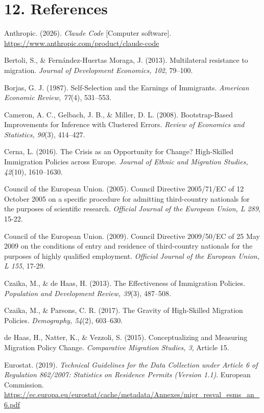 \documentclass[11pt,a4paper]{article}
\newenvironment{hangrefs}{%
  \par\begingroup\setlength{\leftskip}{1.5em}\setlength{\parindent}{-1.5em}%
}{\par\endgroup}
\begin{document}
\section{12. References}\label{references}
\begin{hangrefs}


Anthropic. (2026). \emph{Claude Code} {[}Computer software{]}.
\url{https://www.anthropic.com/product/claude-code}

Bertoli, S., \& Fernández-Huertas Moraga, J. (2013). Multilateral
resistance to migration. \emph{Journal of Development Economics, 102},
79--100.

Borjas, G. J. (1987). Self-Selection and the Earnings of Immigrants.
\emph{American Economic Review, 77}(4), 531--553.

Cameron, A. C., Gelbach, J. B., \& Miller, D. L. (2008). Bootstrap-Based
Improvements for Inference with Clustered Errors. \emph{Review of
Economics and Statistics, 90}(3), 414--427.

Cerna, L. (2016). The Crisis as an Opportunity for Change? High-Skilled
Immigration Policies across Europe. \emph{Journal of Ethnic and
Migration Studies, 42}(10), 1610--1630.

Council of the European Union. (2005). Council Directive 2005/71/EC of
12 October 2005 on a specific procedure for admitting third-country
nationals for the purposes of scientific research. \emph{Official
Journal of the European Union, L 289}, 15-22.

Council of the European Union. (2009). Council Directive 2009/50/EC of
25 May 2009 on the conditions of entry and residence of third-country
nationals for the purposes of highly qualified employment.
\emph{Official Journal of the European Union, L 155}, 17-29.

Czaika, M., \& de Haas, H. (2013). The Effectiveness of Immigration
Policies. \emph{Population and Development Review, 39}(3), 487--508.

Czaika, M., \& Parsons, C. R. (2017). The Gravity of High-Skilled
Migration Policies. \emph{Demography, 54}(2), 603--630.

de Haas, H., Natter, K., \& Vezzoli, S. (2015). Conceptualizing and
Measuring Migration Policy Change. \emph{Comparative Migration Studies,
3}, Article 15.

Eurostat. (2019). \emph{Technical Guidelines for the Data Collection
under Article 6 of Regulation 862/2007: Statistics on Residence Permits
(Version 1.1)}. European Commission.
\url{https://ec.europa.eu/eurostat/cache/metadata/Annexes/migr_resval_esms_an_6.pdf}


\end{hangrefs}
\end{document}
